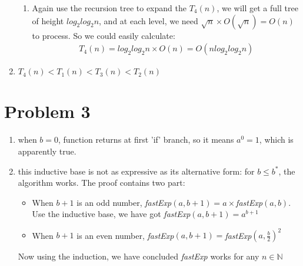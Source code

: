 \documentclass[paper=a4, fontsize=11pt]{scrartcl} %
\numberwithin{equation}{section} %
\numberwithin{figure}{section} %
\numberwithin{table}{section} %
\begin{document}
\begin{enumerate}[label={2.(\alph*)}]
\begin{enumerate}[label={\roman*.}]
      \item Again use the recursion tree to expand the $T_4(n)$, we will get a
	full tree of height $log_2log_2n$, and at each level, we need $\sqrt{n}
	\times O(\sqrt{n}) = O(n)$ to process. So we could easily calculate:
	\begin{align*}
	  T_4(n) = log_2log_2n \times O(n) = O(n log_2log_2n)
	\end{align*}

    \end{enumerate}

  \item $T_4(n) < T_1(n) < T_3(n) < T_2(n)$

\end{enumerate}


\section*{Problem 3}
\begin{enumerate}[label={3.\arabic*}]
  \item when $b=0$, function returns at first 'if' branch, so it means $a^0=1$, which is apparently true.

  \item this inductive base is not as expressive as its alternative form: for $b \leq b^*$, the algorithm works. The proof contains two part:
    \begin{itemize}
      \item When $b+1$ is an odd number, \textit{fastExp}$(a,b+1)=a\times$\textit{fastExp}$(a,b)$. Use the inductive base, we have got \textit{fastExp}$(a,b+1) = a^{b+1}$
      \item When $b+1$ is an even number, \textit{fastExp}$(a,b+1)=$\textit{fastExp}$(a, \frac{b}{2})^2$ 
    \end{itemize}
    Now using the induction, we have concluded \textit{fastExp} works for any $n \in \mathbb{N}$

\end{enumerate}

\end{document}
